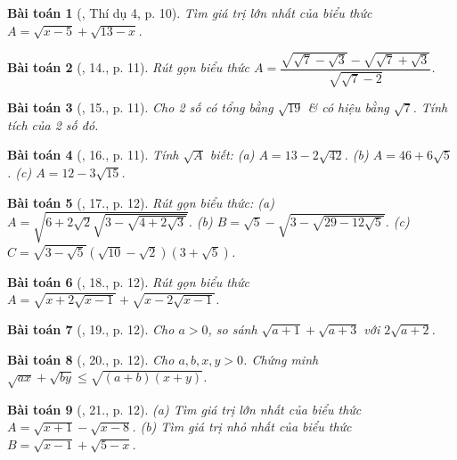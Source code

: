 \documentclass{article}
\newtheorem{baitoan}{Bài toán}
\begin{document}
\begin{baitoan}[\cite{Tuyen_Toan_9}, Thí dụ 4, p. 10]
	Tìm giá trị lớn nhất của biểu thức $A = \sqrt{x - 5} + \sqrt{13 - x}$.
\end{baitoan}

\begin{baitoan}[\cite{Tuyen_Toan_9}, 14., p. 11]
	Rút gọn biểu thức $A = \dfrac{\sqrt{\sqrt{7} - \sqrt{3}} - \sqrt{\sqrt{7} + \sqrt{3}}}{\sqrt{\sqrt{7} - 2}}$.
\end{baitoan}

\begin{baitoan}[\cite{Tuyen_Toan_9}, 15., p. 11]
	Cho 2 số có tổng bằng $\sqrt{19}$ \& có hiệu bằng $\sqrt{7}$. Tính tích của 2 số đó.
\end{baitoan}

\begin{baitoan}[\cite{Tuyen_Toan_9}, 16., p. 11]
	Tính $\sqrt{A}$ biết: (a) $A = 13 - 2\sqrt{42}$. (b) $A = 46 + 6\sqrt{5}$. (c) $A = 12 - 3\sqrt{15}$.
\end{baitoan}

\begin{baitoan}[\cite{Tuyen_Toan_9}, 17., p. 12]
	Rút gọn biểu thức: (a) $A = \sqrt{6 + 2\sqrt{2}\sqrt{3 - \sqrt{4 + 2\sqrt{3}}}}$. (b) $B = \sqrt{5} - \sqrt{3 - \sqrt{29 - 12\sqrt{5}}}$. (c) $C = \sqrt{3 - \sqrt{5}}(\sqrt{10} - \sqrt{2})(3 + \sqrt{5})$.
\end{baitoan}

\begin{baitoan}[\cite{Tuyen_Toan_9}, 18., p. 12]
	Rút gọn biểu thức $A = \sqrt{x + 2\sqrt{x - 1}} + \sqrt{x - 2\sqrt{x - 1}}$.
\end{baitoan}

\begin{baitoan}[\cite{Tuyen_Toan_9}, 19., p. 12]
	Cho $a > 0$, so sánh $\sqrt{a + 1} + \sqrt{a + 3}$ với $2\sqrt{a + 2}$.
\end{baitoan}

\begin{baitoan}[\cite{Tuyen_Toan_9}, 20., p. 12]
	Cho $a,b,x,y > 0$. Chứng minh $\sqrt{ax} + \sqrt{by}\le\sqrt{(a + b)(x + y)}$.
\end{baitoan}

\begin{baitoan}[\cite{Tuyen_Toan_9}, 21., p. 12]
	(a) Tìm giá trị lớn nhất của biểu thức $A = \sqrt{x + 1} - \sqrt{x - 8}$. (b) Tìm giá trị nhỏ nhất của biểu thức $B = \sqrt{x - 1} + \sqrt{5 - x}$.
\end{baitoan}
\end{document}
